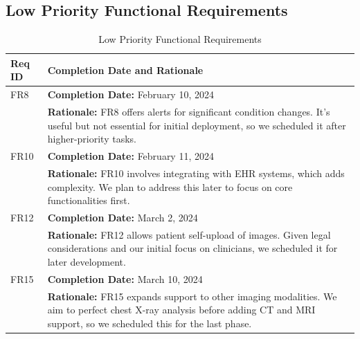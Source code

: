 \documentclass[12pt]{article}
\begin{document}
  \subsection{Low Priority Functional Requirements}
\begin{table}[H]
  \label{TblLowPriorityFRs}
  \begin{tabular}{p{}|p{}}
  \toprule
  \textbf{Req ID} & \textbf{Completion Date and Rationale} \\
  \midrule
  FR8 & \textbf{Completion Date:} February 10, 2024\\
      & \textbf{Rationale:} FR8 offers alerts for significant condition changes. It's useful but not essential for initial deployment, so we scheduled it after higher-priority tasks. \\
  \midrule
  FR10 & \textbf{Completion Date:} February 11, 2024\\
       & \textbf{Rationale:} FR10 involves integrating with EHR systems, which adds complexity. We plan to address this later to focus on core functionalities first. \\
  \midrule
  FR12 & \textbf{Completion Date:} March 2, 2024\\
       & \textbf{Rationale:} FR12 allows patient self-upload of images. Given legal considerations and our initial focus on clinicians, we scheduled it for later development. \\
  \midrule
  FR15 & \textbf{Completion Date:} March 10, 2024\\
       & \textbf{Rationale:} FR15 expands support to other imaging modalities. We aim to perfect chest X-ray analysis before adding CT and MRI support, so we scheduled this for the last phase. \\
  \bottomrule
  \end{tabular}
  \caption{Low Priority Functional Requirements}
  \end{table}
  
\end{document}
